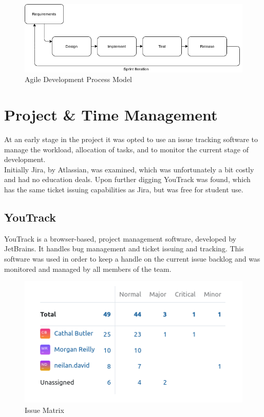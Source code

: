 \begin{figure}[h!]
    \caption{Agile Development Process Model}
    \label{image:agileModel}
    \centering
    \includegraphics[width=1.0\textwidth]{images/AgileModel.png}
\end{figure}

\section{Project \& Time Management}
At an early stage in the project it was opted to use an issue tracking software to manage the workload, allocation of tasks, and to monitor the current stage of development.
\\ Initially Jira, by Atlassian, was examined, which was unfortunately a bit costly and had no education deals. Upon further digging YouTrack was found, which has the same ticket issuing capabilities as Jira, but was free for student use.
\subsection{YouTrack}
YouTrack is a browser-based, project management software, developed by JetBrains. It handles bug management and ticket issuing and tracking. This software was used in order to keep a handle on the current issue backlog and was monitored and managed by all members of the team. 

\begin{figure}[h!]
    \caption{Issue Matrix}
    \label{image:issuesMatrix}
    \centering
    \includegraphics[width=1.0\textwidth]{images/IssuesMatrix.png}
\end{figure}

